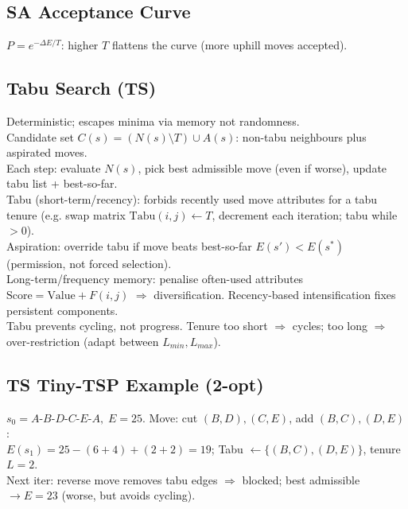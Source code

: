 \subsection*{SA Acceptance Curve}
\( P=e^{-\Delta E/T} \): higher \(T\) flattens the curve (more uphill moves accepted).

\subsection*{Tabu Search (TS)}
Deterministic; escapes minima via memory not randomness.\\
Candidate set \( C(s)=(N(s)\setminus T)\cup A(s) \): non-tabu neighbours plus aspirated moves.\\
Each step: evaluate \(N(s)\), pick best admissible move (even if worse), update tabu list + best-so-far.\\
Tabu (short-term/recency): forbids recently used move attributes for a tabu tenure (e.g. swap matrix \( \text{Tabu}(i,j)\leftarrow T \), decrement each iteration; tabu while \(>0\)).\\
Aspiration: override tabu if move beats best-so-far \( E(s')<E(s^*) \) (permission, not forced selection).\\
Long-term/frequency memory: penalise often-used attributes \( \text{Score}=\text{Value}+F(i,j) \) \(\Rightarrow\) diversification. Recency-based intensification fixes persistent components.\\
Tabu prevents cycling, not progress. Tenure too short \(\Rightarrow\) cycles; too long \(\Rightarrow\) over-restriction (adapt between \(L_{min},L_{max}\)).

\subsection*{TS Tiny-TSP Example (2-opt)}
\( s_0{=}A\text{-}B\text{-}D\text{-}C\text{-}E\text{-}A,\;E{=}25 \). Move: cut \((B,D),(C,E)\), add \((B,C),(D,E)\):\\
\( E(s_1)=25-(6{+}4)+(2{+}2)=19 \); Tabu \(\leftarrow\{(B,C),(D,E)\}\), tenure \(L{=}2\).\\
Next iter: reverse move removes tabu edges \(\Rightarrow\) blocked; best admissible \(\to E=23\) (worse, but avoids cycling).


